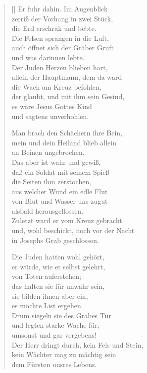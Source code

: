 \begin{multicols}{2}
\begin{verse}[\versewidth]
 Er fuhr dahin. Im Augenblick\\
zerriß der Vorhang in zwei Stück,\\
die Erd erschrak und bebte.\\
Die Felsen sprangen in die Luft,\\
auch öffnet sich der Gräber Gruft\\
und was darinnen lebte.\\
Der Juden Herzen blieben hart,\\
allein der Hauptmann, dem da ward\\
die Wach am Kreuz befohlen,\\
der glaubt, und mit ihm sein Gesind,\\
es wäre Jesus Gottes Kind\\
und sagtens unverhohlen.

 Man brach den Schächern ihre Bein,\\
mein und dein Heiland blieb allein\\
an Beinen ungebrochen.\\
Das aber ist wahr und gewiß,\\
daß ein Soldat mit seinem Spieß\\
die Seiten ihm zerstochen,\\
aus welcher Wund ein edle Flut\\
von Blut und Wasser uns zugut\\
alsbald herausgeflossen.\\
Zuletzt ward er vom Kreuz gebracht\\
und, wohl beschickt, noch vor der Nacht\\
in Josephs Grab geschlossen.

 Die Juden hatten wohl gehört,\\
er würde, wie er selbst gelehrt,\\
von Toten auferstehen;\\
das halten sie für unwahr sein,\\
sie bilden ihnen aber ein,\\
es möchte List ergehen.\\
Drum siegeln sie des Grabes Tür\\
und legten starke Wache für;\\
umsonst und gar vergebens!\\
Der Herr dringt durch, kein Fels und Stein,\\
kein Wächter mag zu mächtig sein\\
dem Fürsten unsres Lebens.


\end{verse}
\end{multicols}
